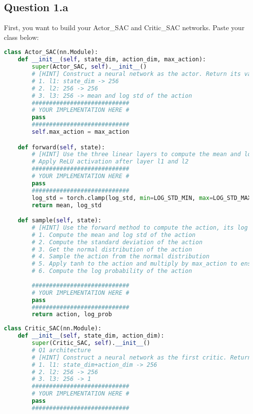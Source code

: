 \documentclass[12pt]{article}
\begin{document}
\subsection*{Question 1.a} 
First, you want to build your Actor\_SAC and Critic\_SAC networks.
Paste your class below:
\begin{solution}
\begin{lstlisting}[language=Python]
class Actor_SAC(nn.Module):
    def __init__(self, state_dim, action_dim, max_action):
        super(Actor_SAC, self).__init__()
        # [HINT] Construct a neural network as the actor. Return its value using forward You need to write down three linear layers.
        # 1. l1: state_dim -> 256
        # 2. l2: 256 -> 256
        # 3. l3: 256 -> mean and log std of the action
        ############################
        # YOUR IMPLEMENTATION HERE #
        pass
        ############################
        self.max_action = max_action

    def forward(self, state):
        # [HINT] Use the three linear layers to compute the mean and log std of the action
        # Apply ReLU activation after layer l1 and l2
        ############################
        # YOUR IMPLEMENTATION HERE #
        pass
        ############################
        log_std = torch.clamp(log_std, min=LOG_STD_MIN, max=LOG_STD_MAX)
        return mean, log_std

    def sample(self, state):
        # [HINT] Use the forward method to compute the action, its log probability
        # 1. Compute the mean and log std of the action
        # 2. Compute the standard deviation of the action
        # 3. Get the normal distribution of the action
        # 4. Sample the action from the normal distribution
        # 5. Apply tanh to the action and multiply by max_action to ensure the action is in the range of the action space
        # 6. Compute the log probability of the action
        
        ############################
        # YOUR IMPLEMENTATION HERE #
        pass
        ############################
        return action, log_prob
\end{lstlisting}
\begin{lstlisting}[language=Python]
class Critic_SAC(nn.Module):
    def __init__(self, state_dim, action_dim):
        super(Critic_SAC, self).__init__()
        # Q1 architecture
        # [HINT] Construct a neural network as the first critic. Return its value using forward You need to write down three linear layers.
        # 1. l1: state_dim+action_dim -> 256
        # 2. l2: 256 -> 256
        # 3. l3: 256 -> 1
        ############################
        # YOUR IMPLEMENTATION HERE #
        pass
        ############################


\end{lstlisting}
\end{solution}
\end{document}
